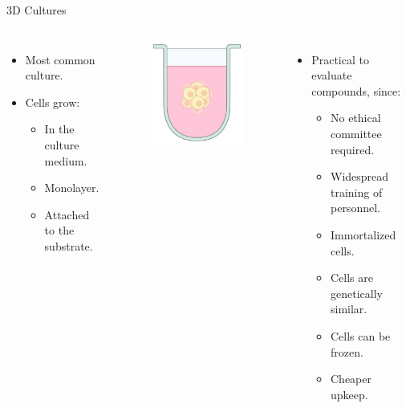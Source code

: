 \begin{frame}{3D Cultures}
    \begin{columns}
        \begin{itemize}
            \item<1-> Most common culture.
            \item<2-> Cells grow:
            \begin{itemize}
                \item<3-> In the culture medium.
                \item<4-> Monolayer.
                \item<5-> Attached to the substrate.
            \end{itemize}
        \end{itemize}

        \begin{figure}[!htb]
            \centering
            \includegraphics[width=6cm]{figures/introduction/3D_culture}
        \end{figure}

        \begin{itemize}
            \item<6-> Practical to evaluate compounds, since:
            \begin{itemize}
                \item<7-> No ethical committee required.
                \item<8-> Widespread training of personnel.
                \item<9-> Immortalized cells.
                \item<10-> Cells are genetically similar.
                \item<11-> Cells can be frozen.
                \item<12-> Cheaper upkeep.
            \end{itemize}
        \end{itemize}
    \end{columns}
\end{frame}

